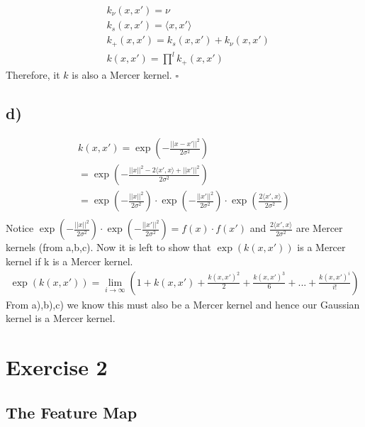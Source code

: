 \documentclass{article}
\begin{document}
\begin{align}
    & k_\nu(x, x') = \nu \\
    & k_s(x, x') = \langle{}x, x'\rangle{} \\
    & k_+(x, x') = k_s(x, x') + k_\nu(x, x') \\
    & k(x, x') = \prod^l k_+(x, x')
\end{align}
Therefore, it $k$ is also a Mercer kernel. \hfill $\square$
\\


\subsection*{d)}
\begin{gather*}
k(x,x') = \exp{}(- \frac{||x-x'||^2}{2\sigma^2}) \\
= \exp{}(-\frac{||x||^2 - 2\langle{}x',x\rangle{} + ||x'||^2}{2\sigma^2}) \\
= \exp{}(-\frac{||x||^2}{2\sigma^2}) \cdot \exp{}(-\frac{||x'||^2}{2\sigma^2}) \cdot \exp{}(\frac{2\langle{}x',x\rangle{}}{2\sigma^2}) \\ 
\end{gather*}
Notice $\exp{}(-\frac{||x||^2}{2\sigma^2}) \cdot \exp{}(-\frac{||x'||^2}{2\sigma^2}) = f(x)\cdot f(x')$ and $\frac{2\langle{}x',x\rangle{}}{2\sigma^2}$ are Mercer kernels (from a,b,c). Now it is left to show that $\exp{}(k(x,x'))$ is a Mercer kernel if k is a Mercer kernel.
\begin{gather*}
\exp{}(k(x,x')) = \lim\limits_{i \rightarrow \infty}{(1 + k(x,x') + \frac{k(x,x')^2}{2} + \frac{k(x,x')^3}{6} + ... + \frac{k(x,x')^i}{i!})}
\end{gather*}
From a),b),c) we know this must also be a Mercer kernel and hence our Gaussian kernel is a Mercer kernel. 



\section*{Exercise 2}

\subsection*{The Feature Map}
\end{document}
